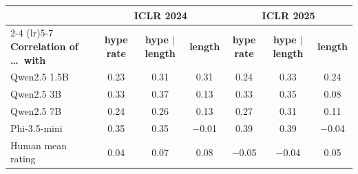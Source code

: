 \begin{tabular}{lcccccc}
\toprule
 & \multicolumn{3}{c}{\textbf{ICLR 2024}} & \multicolumn{3}{c}{\textbf{ICLR 2025}} \\
\cmidrule(lr){2-4} \cmidrule(lr){5-7}
\textbf{Correlation of \ldots\ with} & \textbf{hype rate} & \textbf{hype $|$ length} & \textbf{length} & \textbf{hype rate} & \textbf{hype $|$ length} & \textbf{length} \\
\midrule
Qwen2.5 1.5B & 0.23 & 0.31 & 0.31 & 0.24 & 0.33 & 0.24 \\
Qwen2.5 3B & 0.33 & 0.37 & 0.13 & 0.33 & 0.35 & 0.08 \\
Qwen2.5 7B & 0.24 & 0.26 & 0.13 & 0.27 & 0.31 & 0.11 \\
Phi-3.5-mini & 0.35 & 0.35 & $-$0.01 & 0.39 & 0.39 & $-$0.04 \\
\midrule
Human mean rating & 0.04 & 0.07 & 0.08 & $-$0.05 & $-$0.04 & 0.05 \\
\bottomrule
\end{tabular}
